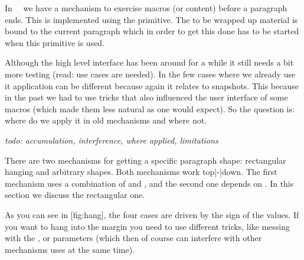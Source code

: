 \stopsection

\startsection[title=Wrapping up]

In \CONTEXT\ \LMTX\ we have a mechanism to exercise macros (or content) before a
paragraph ends. This is implemented using the \type {\wrapuppar} primitive. The
to be wrapped up material is bound to the current paragraph which in order to
get this done has to be started when this primitive is used.

Although the high level interface has been around for a while it still needs a
bit more testing (read: use cases are needed). In the few cases where we already
use it application can be different because again it relates to snapshots. This
because in the past we had to use tricks that also influenced the user interface
of some macros (which made them less natural as one would expect). So the
question is: where do we apply it in old mechanisms and where not.

{\em todo: accumulation, interference, where applied, limitations}


\stopsection

\startsection[title=Hanging]

There are two mechanisms for getting a specific paragraph shape: rectangular
hanging and arbitrary shapes. Both mechanisms work top|-|down. The first
mechanism uses a combination of \type {\hangafter} and \type {\hangindent}, and
the second one depends on \type {\parshape}. In this section we discuss the
rectangular one.

\startbuffer[demo-5]
 \hangindent  4cm  \page
{} \hangindent  4cm  \page
{} \hangindent -4cm  \page
{} \hangindent -4cm  \page
\stopbuffer

\typebuffer[demo-5][option=TEX]

As you can see in  [fig:hang], the four cases are driven by the sign
of the values. If you want to hang into the margin you need to use different
tricks, like messing with the \type {\leftskip}, \type {\rightskip} or \type
{\parindent} parameters (which then of course can interfere with other mechanisms
uses at the same time).

